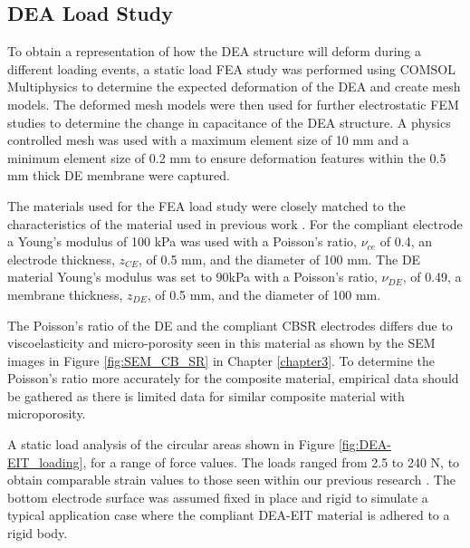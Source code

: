 \subsection{DEA Load Study}
To obtain a representation of how the DEA structure will deform during a different loading events, a static load FEA study was performed using COMSOL Multiphysics \cite{COMSOL2022} to determine the expected deformation of the DEA and create mesh models. The deformed mesh models were then used for further electrostatic FEM studies to determine the change in capacitance of the DEA structure. A physics controlled mesh was used with a maximum element size of 10 mm and a minimum element size of 0.2 mm to ensure deformation features within the 0.5 mm thick DE membrane were captured.

The materials used for the FEA load study were closely matched to the characteristics of the material used in previous work \cite{Ellingham2024} . For the compliant electrode a Young's modulus of 100 kPa was used with a Poisson's ratio, $\nu_{ce}$ of 0.4, an electrode thickness, $z_{CE}$, of 0.5 mm, and the diameter of 100 mm. The DE material Young's modulus was set to 90kPa with a Poisson's ratio, $\nu_{DE}$, of 0.49, a membrane thickness, $z_{DE}$, of 0.5 mm, and the diameter of 100 mm. 

The Poisson's ratio of the DE and the compliant CBSR electrodes differs due to viscoelasticity and micro-porosity seen in this material as shown by the SEM images in Figure \ref{fig:SEM_CB_SR} in Chapter \ref{chapter3}. To determine the Poisson's ratio more accurately for the composite material, empirical data should be gathered as there is limited data for similar composite material with microporosity.  %

A static load analysis of the circular areas shown in Figure \ref{fig:DEA-EIT_loading}, for a range of force values. The loads ranged from 2.5 to 240 N, to obtain comparable strain values to those seen within our previous research \cite{Ellingham2021,Ellingham2024} . The bottom electrode surface was assumed fixed in place and rigid to simulate a typical application case where the compliant DEA-EIT material is adhered to a rigid body.

